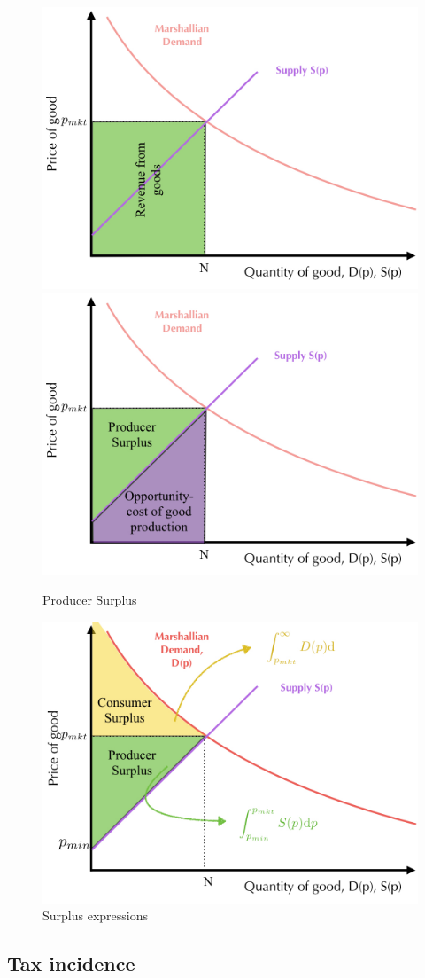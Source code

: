 \documentclass[11pt,english]{article}
\begin{document}
\begin{figure}[htpb!]
	\centering
	\includegraphics[width=0.5\linewidth]{Figures/PS1}\includegraphics[width=0.5\linewidth]{Figures/PS2}
	\caption{Producer Surplus}
	\label{fig:PS}
\end{figure}

\begin{figure}[htpb!]
	\centering
	\includegraphics[width=0.8\linewidth]{Figures/SS}
	\caption{Surplus expressions}
	\label{fig:SS}
\end{figure}


\FloatBarrier
\subsection{Tax incidence}
\end{document}
